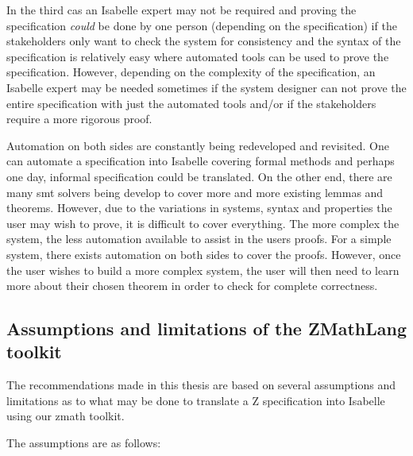 In the third cas an Isabelle expert may not be
required and proving the specification \textit{could} be done by one person
(depending on the specification) if the stakeholders only want to check the system for consistency
and
the syntax of the specification is relatively easy where automated tools can be
used to prove the specification. However, depending on the complexity of the
specification, an Isabelle expert may be needed sometimes if the system designer
can not prove the entire specification with just the automated tools and/or if
the stakeholders require a more rigorous proof.

Automation on both sides are constantly being redeveloped and revisited. One can
automate a specification into Isabelle covering formal methods and perhaps one
day, informal specification could be translated. On the other end, there are
many \gls{smt} solvers being develop to cover more and more existing lemmas and
theorems. However, due to the variations in systems, syntax and properties the
user may wish to prove, it is difficult to cover everything. The more complex
the system, the less automation available to assist in the users proofs. For a
simple system, there exists automation on both sides to cover the proofs.
However, once the user wishes to build a more complex system, the user will then
need to learn more about their chosen theorem in order to check for complete
correctness.

\subsection{Assumptions and limitations of the ZMathLang toolkit}

The recommendations made in this thesis are based on several assumptions and
limitations as to what may be done to translate a Z specification into Isabelle
using our \gls{zmath} toolkit.

The assumptions are as follows:

